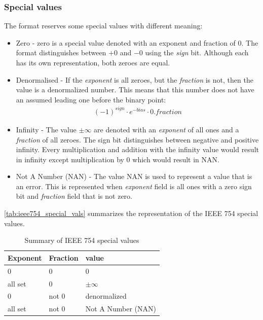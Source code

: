 \documentclass[10pt]{article}
\begin{document}
\subsubsection{Special values}\label{sec:special-values}

The format reserves some special values with different meaning:
\begin{itemize}
  \item Zero - zero is a special value denoted with an exponent and fraction of
  0. The format distinguishes between $+0$ and $-0$ using the \textit{sign} bit.
  Although each has its own representation, both zeroes are equal.
  \item Denormalised - If the \textit{exponent} is all zeroes, but the
  \textit{fraction} is not, then the value is a denormalized number. This means
  that this number does not have an assumed leading one before the binary point:
  \begin{align*}
    (-1)^{sign} \cdot e^{-bias} \cdot 0.fraction
  \end{align*}
  \item Infinity - The value $\pm \infty$ are denoted with an \textit{exponent} of all
  ones and a \textit{fraction} of all zeroes. The sign bit distinguishes between
  negative and positive infinity. Every multiplication and addition with the
  infinity value would result in infinity except multiplication by 0 which would
  result in NAN.
  \item Not A Number (NAN) - The value NAN is used to represent a value that is
  an error. This is represented when \textit{exponent} field is all ones with a
  zero sign bit and \textit{fraction} field that is not zero.

\end{itemize}

\autoref{tab:ieee754_special_vals} summarizes the representation of the IEEE 754
special values.

\begin{table}[h]\centering
  
  \begin{tabular}{|l|l|l|}
    \hline
    Exponent & Fraction & value \\
    \hline
    0 & 0 & 0 \\
    \hline
    all set & 0 & $\pm \infty$ \\
    \hline
    0 & not 0 & denormalized \\
    \hline
    all set & not 0 & Not A Number (NAN) \\
    \hline
  \end{tabular}
  
  \caption{Summary of IEEE 754 special values}
  \label{tab:ieee754_special_vals}
\end{table}
\end{document}

